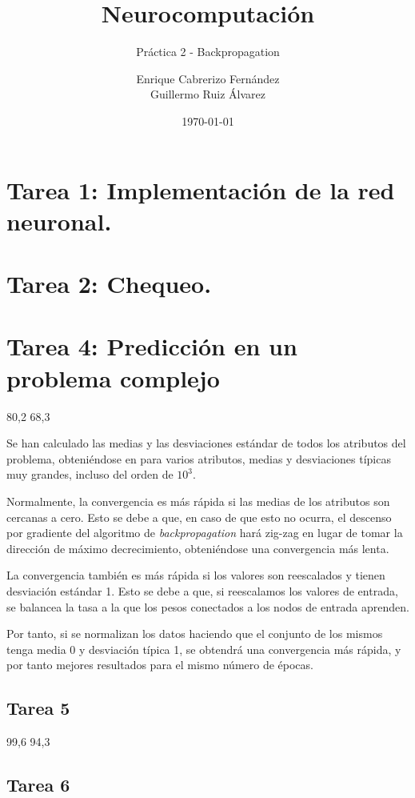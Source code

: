\documentclass[spanish]{assignment}
\title{Neurocomputación}
\subtitle{Práctica 2 - Backpropagation}
\author{Enrique Cabrerizo Fernández\\ Guillermo Ruiz Álvarez}
\date{\today}
\begin{document}
	\makepre
	\section{Tarea 1: Implementación de la red neuronal.}
	
	\section{Tarea 2: Chequeo.}
	
	\section{Tarea 4: Predicción en un problema complejo}
	80,2
	68,3
	
	Se han calculado las medias y las desviaciones estándar de todos los atributos del problema, obteniéndose en para varios atributos, medias y desviaciones típicas muy grandes, incluso del orden de $10^3$.
	
	Normalmente, la convergencia es más rápida si las medias de los atributos son cercanas a cero. Esto se debe a que, en caso de que esto no ocurra, el descenso por gradiente del algoritmo de \textit{backpropagation} hará zig-zag en lugar de tomar la dirección de máximo decrecimiento, obteniéndose una convergencia más lenta. 
	
	La convergencia también es más rápida si los valores son reescalados y tienen desviación estándar 1. Esto se debe a que, si reescalamos los valores de entrada, se balancea la tasa a la que los pesos conectados a los nodos de entrada aprenden.
	
	Por tanto, si se normalizan los datos haciendo que el conjunto de los mismos tenga media 0 y desviación típica 1, se obtendrá una convergencia más rápida, y por tanto mejores resultados para el mismo número de épocas.
	
	\subsection{Tarea 5}
	99,6
	94,3
	
	\subsection{Tarea 6}
\end{document}
